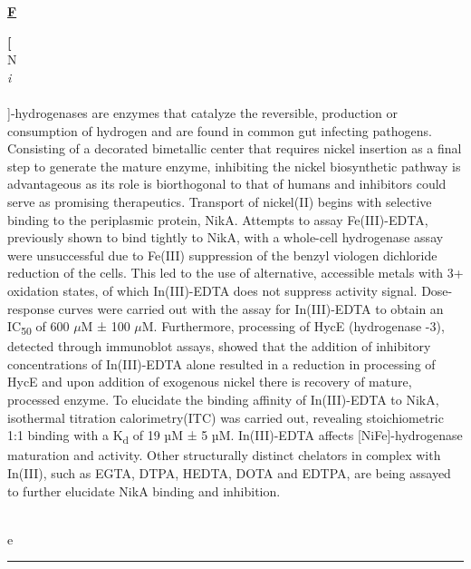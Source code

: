 \documentclass[titlepage,oneside,openany,10pt]{book}
\newenvironment{posterabswref}[5] %
        {
        \newcommand{\posterref}{#5}
	\begin{flushright}
                \underline{\textbf{#4}}
        \end{flushright}
        \textbf{#1}\\%
        #2\\%
        \textit{#3}\\\\%
        }
        {
        \vspace{0.5cm}
        \\\noindent \posterref \\ \noindent\rule{15cm}{0.5pt}%
        }
\begin{document}
\begin{posterabswref}
    {[}NiFe{]}-hydrogenases are enzymes that catalyze the reversible, production or consumption of hydrogen and are found in common gut infecting pathogens. Consisting of a decorated bimetallic center that requires nickel insertion as a final step to generate the mature enzyme, inhibiting the nickel biosynthetic pathway is advantageous as its role is biorthogonal to that of humans and inhibitors could serve as promising therapeutics. Transport of nickel(II) begins with selective binding to the periplasmic protein, NikA. Attempts to assay Fe(III)-EDTA, previously shown to bind tightly to NikA, with a whole-cell hydrogenase assay were unsuccessful due to Fe(III) suppression of the benzyl viologen dichloride reduction of the cells. This led to the use of alternative, accessible metals with 3+ oxidation states, of which In(III)-EDTA does not suppress activity signal. Dose-response curves were carried out with the assay for In(III)-EDTA to obtain an IC\textsubscript{50} of 600 $\mu$M ± 100 $\mu$M. Furthermore, processing of HycE (hydrogenase -3), detected through immunoblot assays, showed that the addition of inhibitory concentrations of In(III)-EDTA alone resulted in a reduction in processing of HycE and upon addition of exogenous nickel there is recovery of mature, processed enzyme. To elucidate the binding affinity of In(III)-EDTA to NikA, isothermal titration calorimetry(ITC) was carried out, revealing stoichiometric 1:1 binding with a K\textsubscript{d} of 19 µM ± 5 µM. In(III)-EDTA affects {[}NiFe{]}-hydrogenase maturation and activity. Other structurally distinct chelators in complex with In(III), such as EGTA, DTPA, HEDTA, DOTA and EDTPA, are being assayed to further elucidate NikA binding and inhibition.
    \label{SebastiampillaiS}
\end{posterabswref}

\newpage
\end{document}
